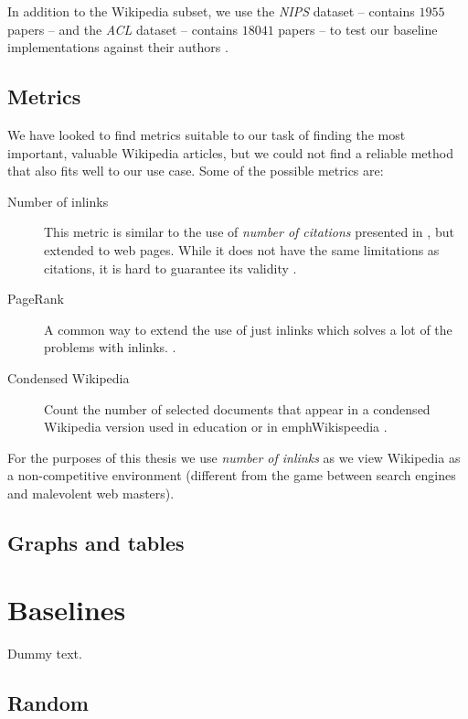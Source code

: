 In addition to the Wikipedia subset, we use the \emph{\acf{NIPS}} dataset --
contains \(1955\) papers -- and the \emph{\acf{ACL}} dataset -- contains
\(18041\) papers -- to test our baseline implementations against their authors
\cite{sipos2012temporal}.

\subsection{Metrics}

We have looked to find metrics suitable to our task of finding the most
important, valuable Wikipedia articles, but we could not find a reliable method
that also fits well to our use case.
Some of the possible metrics are:
\begin{description}
  \item[Number of inlinks] This metric is similar to the use of \emph{number of
  citations} presented in \cite{sipos2012temporal}, but extended to web pages.
  While it does not have the same limitations as citations, it is hard to
  guarantee its validity .
  \item[PageRank] A common way to extend the use of just inlinks which solves a
  lot of the problems with inlinks.
  .
  \item[Condensed Wikipedia] Count the number of selected documents that appear
  in a condensed Wikipedia version used in education or in emph{Wikispeedia}
  .
\end{description}

For the purposes of this thesis we use \emph{number of inlinks} as we view
Wikipedia as a non-competitive environment (different from the game between
search engines and malevolent web masters).

\subsection{Graphs and tables}

\section{Baselines}

Dummy text. 

\subsection{Random}

